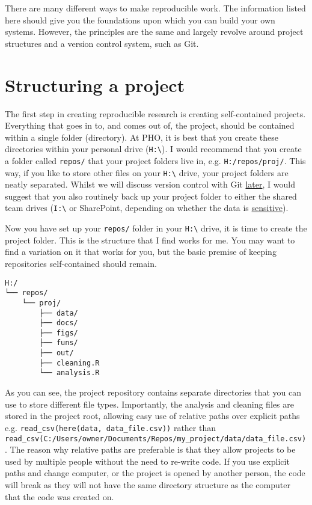 \documentclass[]{book}
\begin{document}
There are many different ways to make reproducible work. The information listed here should give you the foundations upon which you can build your own systems. However, the principles are the same and largely revolve around project structures and a version control system, such as Git.

\hypertarget{structuring-a-project}{%
\section{Structuring a project}\label{structuring-a-project}}

The first step in creating reproducible research is creating self-contained projects. Everything that goes in to, and comes out of, the project, should be contained within a single folder (directory). At PHO, it is best that you create these directories within your personal drive (\texttt{H:\textbackslash{}}). I would recommend that you create a folder called \texttt{repos/} that your project folders live in, e.g. \texttt{H:/repos/proj/}. This way, if you like to store other files on your \texttt{H:\textbackslash{}} drive, your project folders are neatly separated. Whilst we will discuss version control with Git \protect\hyperlink{git}{later}, I would suggest that you also routinely back up your project folder to either the shared team drives (\texttt{I:\textbackslash{}} or SharePoint, depending on whether the data is \protect\hyperlink{sensitive-data}{sensitive}).

Now you have set up your \texttt{repos/} folder in your \texttt{H:\textbackslash{}} drive, it is time to create the project folder. This is the structure that I find works for me. You may want to find a variation on it that works for you, but the basic premise of keeping repositories self-contained should remain.

\begin{verbatim}
H:/
└── repos/
    └── proj/
        ├── data/
        ├── docs/
        ├── figs/
        ├── funs/
        ├── out/
        ├── cleaning.R
        └── analysis.R
\end{verbatim}

As you can see, the project repository contains separate directories that you can use to store different file types. Importantly, the analysis and cleaning files are stored in the project root, allowing easy use of relative paths over explicit paths e.g. \texttt{read\_csv(here(\textquotesingle{}data\textquotesingle{},\ \textquotesingle{}data\_file.csv\textquotesingle{}))} rather than \texttt{read\_csv(\textquotesingle{}C:/Users/owner/Documents/Repos/my\_project/data/data\_file.csv\textquotesingle{})}. The reason why relative paths are preferable is that they allow projects to be used by multiple people without the need to re-write code. If you use explicit paths and change computer, or the project is opened by another person, the code will break as they will not have the same directory structure as the computer that the code was created on.
\end{document}
